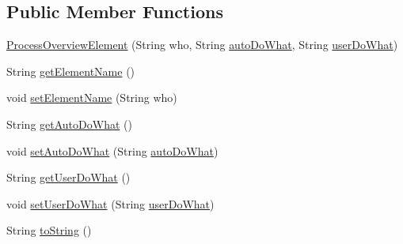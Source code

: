 \subsection*{Public Member Functions}
\begin{DoxyCompactItemize}
\item 
\hyperlink{classit_1_1isislab_1_1masonassisteddocumentation_1_1_o_d_d_1_1_process_overview_element_a375f96789dfd2714690b09c252e9495e}{Process\-Overview\-Element} (String who, String \hyperlink{classit_1_1isislab_1_1masonassisteddocumentation_1_1_o_d_d_1_1_process_overview_element_a911b694816293e12e2821c2fc93653cf}{auto\-Do\-What}, String \hyperlink{classit_1_1isislab_1_1masonassisteddocumentation_1_1_o_d_d_1_1_process_overview_element_ab39c20998999736850ea082841f50d13}{user\-Do\-What})
\item 
String \hyperlink{classit_1_1isislab_1_1masonassisteddocumentation_1_1_o_d_d_1_1_process_overview_element_a8c9612b30aa42f9c4423976b5c16b125}{get\-Element\-Name} ()
\item 
void \hyperlink{classit_1_1isislab_1_1masonassisteddocumentation_1_1_o_d_d_1_1_process_overview_element_af796eda371d59cfc3f4cb1298063625d}{set\-Element\-Name} (String who)
\item 
String \hyperlink{classit_1_1isislab_1_1masonassisteddocumentation_1_1_o_d_d_1_1_process_overview_element_ac1a09e73e39d8d50056fc4ea66de5f4f}{get\-Auto\-Do\-What} ()
\item 
void \hyperlink{classit_1_1isislab_1_1masonassisteddocumentation_1_1_o_d_d_1_1_process_overview_element_a711c4d4dcf408d0504981589ea45b0cd}{set\-Auto\-Do\-What} (String \hyperlink{classit_1_1isislab_1_1masonassisteddocumentation_1_1_o_d_d_1_1_process_overview_element_a911b694816293e12e2821c2fc93653cf}{auto\-Do\-What})
\item 
String \hyperlink{classit_1_1isislab_1_1masonassisteddocumentation_1_1_o_d_d_1_1_process_overview_element_a249427b8f7f30735fe73156b931067b9}{get\-User\-Do\-What} ()
\item 
void \hyperlink{classit_1_1isislab_1_1masonassisteddocumentation_1_1_o_d_d_1_1_process_overview_element_a6b6841ab11f4e0774785ec4429222ec6}{set\-User\-Do\-What} (String \hyperlink{classit_1_1isislab_1_1masonassisteddocumentation_1_1_o_d_d_1_1_process_overview_element_ab39c20998999736850ea082841f50d13}{user\-Do\-What})
\item 
String \hyperlink{classit_1_1isislab_1_1masonassisteddocumentation_1_1_o_d_d_1_1_process_overview_element_a0337481b9893ca9cb20d3cd3ceb29d58}{to\-String} ()
\end{DoxyCompactItemize}

